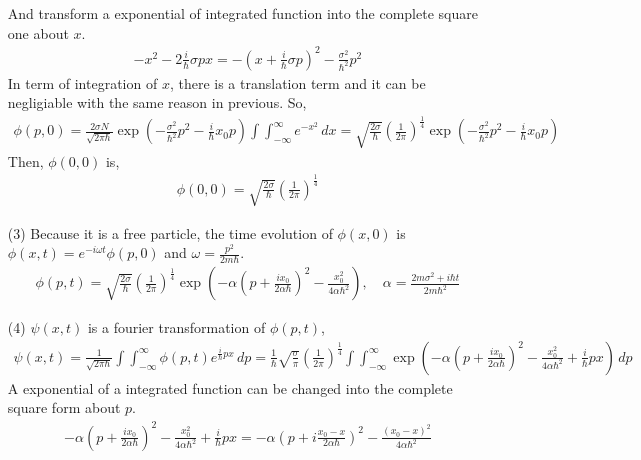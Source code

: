 \documentclass[aps,floatfix,nofootinbib,superscriptaddress,fleqn]{revtex4}
\begin{document}
\begin{itemize}
 And transform a exponential of integrated function into the complete square one about $x$.
\begin{align}
          -x^2-2\frac{i}{\hbar}\sigma px = -{\left( x+\frac{i}{\hbar}\sigma p\right)}^2-\frac{\sigma^2}{\hbar^2}p^2
\end{align}
In term of integration of $x$, there is a translation term and it can be negligiable with the same reason in previous. So,
\begin{align}
          \phi(p,0) = \frac{2\sigma N}{\sqrt{2\pi\hbar}}\exp\left(-\frac{\sigma^2}{\hbar^2}p^2-\frac{i}{\hbar}x_0p\right)\int\int_{-\infty}^{\infty} e^{-x^2}\,dx
                    = \sqrt{\frac{2\sigma }{\hbar}}{\left(\frac{1}{2\pi}\right)}^{\frac{1}{4}}\exp\left(-\frac{\sigma^2}{\hbar^2}p^2-\frac{i}{\hbar}x_0p\right)
\end{align}
Then, $\phi(0,0)$ is,
\begin{align}
          \phi(0,0)=\sqrt{\frac{2\sigma }{\hbar}}{\left(\frac{1}{2\pi}\right)}^{\frac{1}{4}}
\end{align}
\item[(3)] Because it is a free particle, the time evolution of $\phi(x,0)$ is $\phi(x,t)=e^{-i\omega t}\phi(p,0)$ and $\omega = \frac{p^2}{2m\hbar}$.
\begin{align}
          \phi (p,t) = \sqrt{\frac{2\sigma }{\hbar}}{\left(\frac{1}{2\pi}\right)}^{\frac{1}{4}}\exp\left(-\alpha{\left(p+\frac{ix_0}{2\alpha\hbar}\right)}^2 
                      -\frac{x_0^2}{4\alpha\hbar^2}\right),
          \quad \alpha = \frac{2m\sigma^2+i\hbar t}{2m\hbar^2}
\end{align} 
\item[(4)] $\psi(x,t)$ is a fourier transformation of $\phi(p,t)$,
\begin{align}
          \psi(x,t)=\frac{1}{\sqrt{2\pi\hbar}}\int\int_{-\infty}^{\infty}\phi(p,t) e^{\frac{i}{\hbar}px}\,dp
          =\frac{1}{\hbar} \sqrt{\frac{\sigma }{\pi}}{\left(\frac{1}{2\pi}\right)}^{\frac{1}{4}} \int\int_{-\infty}^{\infty} \exp\left(-\alpha{\left(p+\frac{ix_0}{2\alpha\hbar}\right)}^2 
          -\frac{x_0^2}{4\alpha\hbar^2}+\frac{i}{\hbar}px\right)\,dp
\end{align} 
A exponential of a integrated function can be changed into the complete square form about $p$.
\begin{align}
          -\alpha{\left(p+\frac{ix_0}{2\alpha\hbar}\right)}^2 
          -\frac{x_0^2}{4\alpha\hbar^2}+\frac{i}{\hbar}px 
            = -\alpha{\left(p+i\frac{x_0-x}{2\alpha\hbar}\right)}^2
              -\frac{{(x_0-x)}^2}{4\alpha\hbar^2}

\end{align}
\end{itemize}
\end{document}
